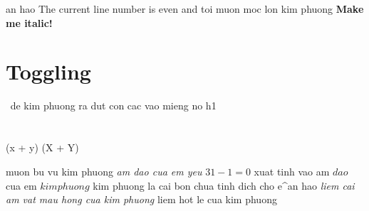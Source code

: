 \begin{num vu kim phuong}
an hao The current line number is even and toi muon moc lon kim phuong
\textbf{Make me italic!}
\section*{Toggling}
$\frac{}{}$
de kim phuong ra dut con cac vao mieng no h1
\section{}
\begin{}
(x + y)
\left(X + Y\right)
\end{}
muon bu vu kim phuong
	\textit{am dao cua em yeu}
$ 31 - 1 = 0 $ 
xuat tinh vao am $dao$ cua em $kim phuong$
kim phuong la cai bon chua tinh dich cho e^{an hao}
	\textit{liem cai am vat mau hong cua kim phuong}
{liem hot le cua kim phuong}
\end{num vu kim phuong}
